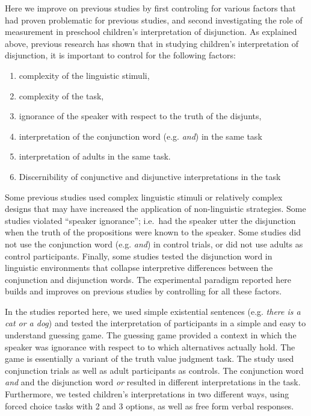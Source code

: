\documentclass[floatsintext,man]{apa6}
\providecommand{\tightlist}{%
  \setlength{\itemsep}{0pt}\setlength{\parskip}{0pt}}
\theoremstyle{definition}
\theoremstyle{definition}
\theoremstyle{definition}
\theoremstyle{remark}
\begin{document}
Here we improve on previous studies by first controling for various
factors that had proven problematic for previous studies, and second
investigating the role of measurement in preschool children's
interpretation of disjunction. As explained above, previous research has
shown that in studying children's interpretation of disjunction, it is
important to control for the following factors:

\begin{enumerate}
\def\labelenumi{\arabic{enumi}.}
\tightlist
\item
  complexity of the linguistic stimuli,
\item
  complexity of the task,
\item
  ignorance of the speaker with respect to the truth of the disjunts,
\item
  interpretation of the conjunction word (e.g. \emph{and}) in the same
  task
\item
  interpretation of adults in the same task.
\item
  Discernibility of conjunctive and disjunctive interpretations in the
  task
\end{enumerate}

Some previous studies used complex linguistic stimuli or relatively
complex designs that may have increased the application of
non-linguistic strategies. Some studies violated \enquote{speaker
ignorance}; i.e.~had the speaker utter the disjunction when the truth of
the propositions were known to the speaker. Some studies did not use the
conjunction word (e.g. \emph{and}) in control trials, or did not use
adults as control participants. Finally, some studies tested the
disjunction word in linguistic environments that collapse interpretive
differences between the conjunction and disjunction words. The
experimental paradigm reported here builds and improves on previous
studies by controlling for all these factors.

In the studies reported here, we used simple existential sentences (e.g.
\emph{there is a cat or a dog}) and tested the interpretation of
participants in a simple and easy to understand guessing game. The
guessing game provided a context in which the speaker was ignorance with
respect to to which alternatives actually hold. The game is essentially
a variant of the truth value judgment task. The study used conjunction
trials as well as adult participants as controls. The conjunction word
\emph{and} and the disjunction word \emph{or} resulted in different
interpretations in the task. Furthermore, we tested children's
interpretations in two different ways, using forced choice tasks with 2
and 3 options, as well as free form verbal responses.
\end{document}

